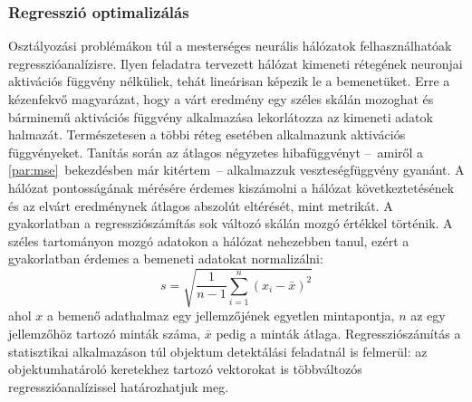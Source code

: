 \subsubsection{Regresszió optimalizálás}
%
Osztályozási problémákon túl a mesterséges neurális hálózatok felhasználhatóak regresszióanalízisre. Ilyen feladatra tervezett hálózat kimeneti rétegének neuronjai aktivációs függvény nélküliek, tehát lineárisan képezik le a bemenetüket. Erre a kézenfekvő magyarázat, hogy a várt eredmény egy széles skálán mozoghat és bárminemű aktivációs függvény alkalmazása lekorlátozza az kimeneti adatok halmazát. Természetesen a többi réteg esetében alkalmazunk aktivációs függvényeket. Tanítás során az átlagos négyzetes hibafüggvényt --~amiről a \ref{par:mse}~bekezdésben már kitértem~-- alkalmazzuk veszteségfüggvény gyanánt. A hálózat pontosságának mérésére érdemes kiszámolni a hálózat következtetésének és az elvárt eredménynek átlagos abszolút eltérését, mint metrikát. A gyakorlatban a regressziószámítás sok változó skálán mozgó értékkel történik. A széles tartományon mozgó adatokon a hálózat nehezebben tanul, ezért a gyakorlatban érdemes a bemeneti adatokat normalizálni:
$$ s = \sqrt{\frac{1}{n-1}\sum_{i=1}^{n}(x_i - \bar{x})^2} $$
ahol $x$ a bemenő adathalmaz egy jellemzőjének egyetlen mintapontja, $n$ az egy jellemzőhöz tartozó minták száma, $\bar{x}$ pedig a minták átlaga.
Regressziószámítás a statisztikai alkalmazáson túl objektum detektálási feladatnál is felmerül: az objektumhatároló keretekhez tartozó vektorokat is többváltozós regresszióanalízissel határozhatjuk meg.
